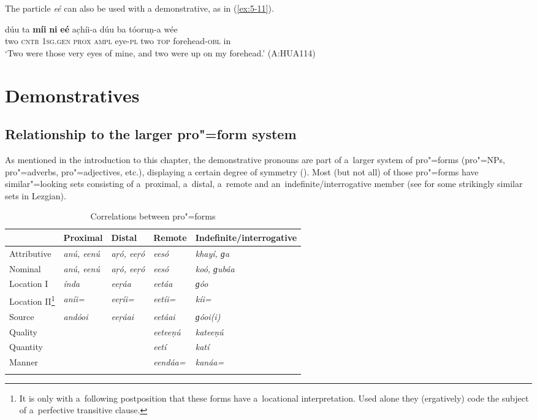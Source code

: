 The particle \textit{eé} can also be used with  a demonstrative, as in (\ref{ex:5-11}). 


\begin{exe}
\ex
\label{ex:5-11}
\gll dúu ta \textbf{míi} \textbf{ni} \textbf{eé} ac̣híi-a dúu ba tóoruṇ-a wée \\
	two \textsc{cntr} \textsc{1sg.gen} \textsc{prox} \textsc{ampl} eye-\textsc{pl} two \textsc{top} forehead-\textsc{obl} in \\
\glt `Two were those very eyes of mine, and two were up on my forehead.' (A:HUA114) 
\end{exe}

\section{Demonstratives}
\label{sec:5-3}

\subsection{Relationship to the larger pro"=form system}
\label{subsec:5-2-1}


As mentioned in the introduction to this chapter, the demonstrative pronouns are part of a~larger system of pro"=forms (pro"=NPs, pro"=adverbs, pro"=adjectives, etc.), displaying a certain degree of symmetry (). Most (but not all) of those pro"=forms have similar"=looking sets consisting of a~proximal, a~distal, a~remote and an~indefinite/interrogative member (see \citealt[187--188]{haspelmath1993} for some strikingly similar sets in Lezgian).



\begin{table}[ht]
\caption{Correlations between pro"=forms}
\begin{tabularx}{\textwidth}{ Q Q Q Q Q }
\lsptoprule
&
Proximal
&
Distal
&
Remote
&
Indefinite/{\allowbreak}interrogative\\\hline
Attributive &
\textit{anú, eenú} &
\textit{aṛó, eeṛó} &
\textit{eesó} &
\textit{khayí, ɡa} \\
Nominal &
\textit{anú, eenú} &
\textit{aṛó, eeṛó} &
\textit{eesó} &
\textit{koó, ɡubáa} \\
Location I &
\textit{índa} &
\textit{eeṛáa} &
\textit{eetáa} &
\textit{ɡóo} \\
Location II\footnote{It is only with a~following postposition that these forms have a~locational interpretation. Used alone they (ergatively) code the subject of a~perfective transitive clause.} &
\textit{aníi=} &
\textit{eeṛíi=} &
\textit{eetíi=} &
\textit{kíi=} \\
Source &
\textit{andóoi} &
\textit{eeṛáai} &
\textit{eetáai} &
\textit{ɡóoi(i)} \\
Quality &
&
&
\textit{eeteeṇú} &
\textit{kateeṇú} \\
Quantity &
&
&
\textit{eetí} &
\textit{katí} \\
Manner &
&
&
\textit{eendáa=} &
\textit{kanáa=} \\\lspbottomrule
\end{tabularx}
\label{tab:5-2}
\end{table}

